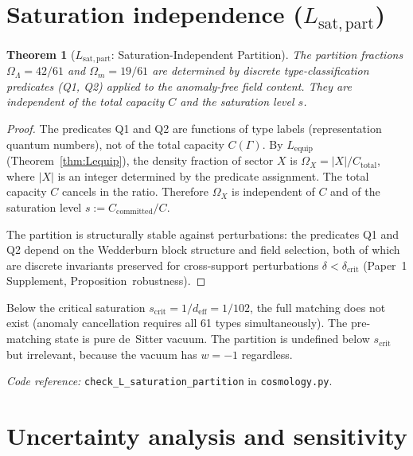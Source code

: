 \documentclass[11pt,a4paper]{article}
\newtheorem{theorem}{Theorem}[section]
\theoremstyle{definition}
\newcommand{\coderef}[2]{\smallskip\noindent\textit{Code reference:} \texttt{#1} in \texttt{#2}.}
\begin{document}
\section{Saturation independence ($L_{\mathrm{sat,part}}$)}
\label{sec:sat_indep}


\begin{theorem}[$L_{\mathrm{sat,part}}$: Saturation-Independent Partition]
\label{thm:sat_part}
The partition fractions $\Omega_\Lambda = 42/61$ and
$\Omega_m = 19/61$ are determined by discrete type-classification
predicates (Q1, Q2) applied to the anomaly-free field content.  They
are independent of the total capacity $C$ and the saturation level $s$.
\end{theorem}

\begin{proof}
The predicates Q1 and Q2 are functions of type labels (representation
quantum numbers), not of the total capacity $C(\Gamma)$.  By
$L_{\mathrm{equip}}$ (Theorem~\ref{thm:Lequip}), the density fraction
of sector $X$ is $\Omega_X = |X|/C_{\mathrm{total}}$, where $|X|$ is
an integer determined by the predicate assignment.  The total capacity
$C$ cancels in the ratio.  Therefore $\Omega_X$ is independent of $C$
and of the saturation level $s := C_{\mathrm{committed}} / C$.

The partition is structurally stable against perturbations: the
predicates Q1 and Q2 depend on the Wedderburn block structure and
field selection, both of which are discrete invariants preserved for
cross-support perturbations $\delta < \delta_{\mathrm{crit}}$
(Paper~1 Supplement, Proposition~robustness).
\end{proof}

\noindent Below the critical saturation $s_{\mathrm{crit}} = 1/d_{\mathrm{eff}}
= 1/102$, the full matching does not exist (anomaly cancellation
requires all 61 types simultaneously).  The pre-matching state is
pure de~Sitter vacuum.  The partition is undefined below
$s_{\mathrm{crit}}$ but irrelevant, because the vacuum has $w = -1$
regardless.

\coderef{check\_L\_saturation\_partition}{cosmology.py}


\section{Uncertainty analysis and sensitivity}
\label{sec:uncertainty}
\end{document}

